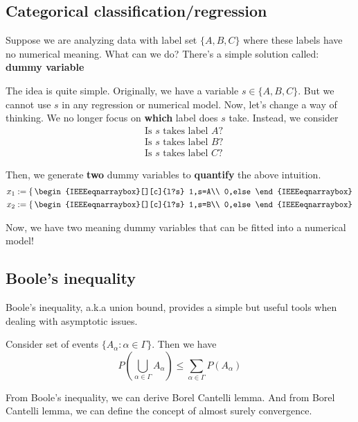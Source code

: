 \documentclass[Probability Theory.tex]{subfiles}
\begin{document}
\subsection{Categorical classification/regression}
Suppose we are analyzing data with label set $\{A,B,C\}$ where these labels have no numerical meaning. What can we do? There's a simple solution called: {\bf dummy variable}

The idea is quite simple. Originally, we have a variable $s\in\{A,B,C\}$. But we cannot use $s$ in any regression or numerical model. Now, let's change a way of thinking. We no longer focus on {\bf which } label does $s$ take. Instead, we consider
\begin{align*}
&\mbox{Is $s$ takes label $A$?}\\
&\mbox{Is $s$ takes label $B$?}\\
&\mbox{Is $s$ takes label $C$?}
\end{align*}

Then, we generate {\bf two} dummy variables to {\bf quantify} the above intuition.
\begin{align*}
&x_1:=\left\{ \,
	\begin{IEEEeqnarraybox}[][c]{l?s}
	1,s=A\\
	0,else
	\end{IEEEeqnarraybox}
	\right.\\
&x_2:=\left\{ \,
\begin{IEEEeqnarraybox}[][c]{l?s}
1,s=B\\
0,else
\end{IEEEeqnarraybox}
\right.
\end{align*}

Now, we have two meaning dummy variables that can be fitted into a numerical model!

\subsection{Boole's inequality}
Boole's inequality, a.k.a union bound, provides a simple but useful tools when dealing with asymptotic issues.
\begin{theorem}
	Consider set of events $\{A_{\alpha}:\alpha\in\Gamma\}$. Then we have
	$$P(\bigcup_{\alpha\in\Gamma}A_{\alpha})\leq\sum_{\alpha\in\Gamma}P(A_{\alpha})$$
\end{theorem}

From Boole's inequality, we can derive Borel Cantelli lemma. And from Borel Cantelli lemma, we can define the concept of almost surely convergence.
\end{document}
